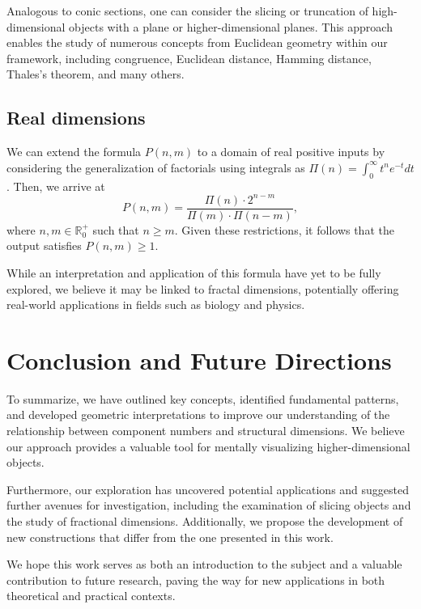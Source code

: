 \documentclass{article}
\begin{document}
	Analogous to conic sections, one can consider the slicing or truncation of high-dimensional objects \cite{coxeter1973regular} with a plane or higher-dimensional planes. This approach enables the study of numerous concepts from Euclidean geometry \cite{euclid} within our framework, including congruence, Euclidean distance, Hamming distance, Thales's theorem, and many others.
	
	
	\subsection{Real dimensions}
	
	We can extend the formula $P(n,m)$ to a domain of real positive inputs by considering the generalization of factorials using integrals as $\Pi(n)=\int_{0}^{\infty} t^n e^{-t} dt$ \cite{rice2007}. Then, we arrive at 
	$$P(n,m)=\frac{\Pi(n) \cdot 2^{n-m}}{\Pi(m) \cdot \Pi(n-m)},$$
	where $n,m \in \mathbb{R}^{+}_{0}$ such that $n\geq m$. Given these restrictions, it follows that the output satisfies $P(n,m) \geq 1$. 
	
	While an interpretation and application of this formula have yet to be fully explored, we believe it may be linked to fractal dimensions, potentially offering real-world applications in fields such as biology and physics.
	
	

	
	\section{Conclusion and Future Directions \label{sec:conclusion}}
	
	To summarize, we have outlined key concepts, identified fundamental patterns, and developed geometric interpretations to improve our understanding of the relationship between component numbers and structural dimensions. We believe our approach provides a valuable tool for mentally visualizing higher-dimensional objects.
	
	Furthermore, our exploration has uncovered potential applications and suggested further avenues for investigation, including the examination of slicing objects and the study of fractional dimensions. Additionally, we propose the development of new constructions that differ from the one presented in this work.
	
	We hope this work serves as both an introduction to the subject and a valuable contribution to future research, paving the way for new applications in both theoretical and practical contexts.
	
\end{document}
